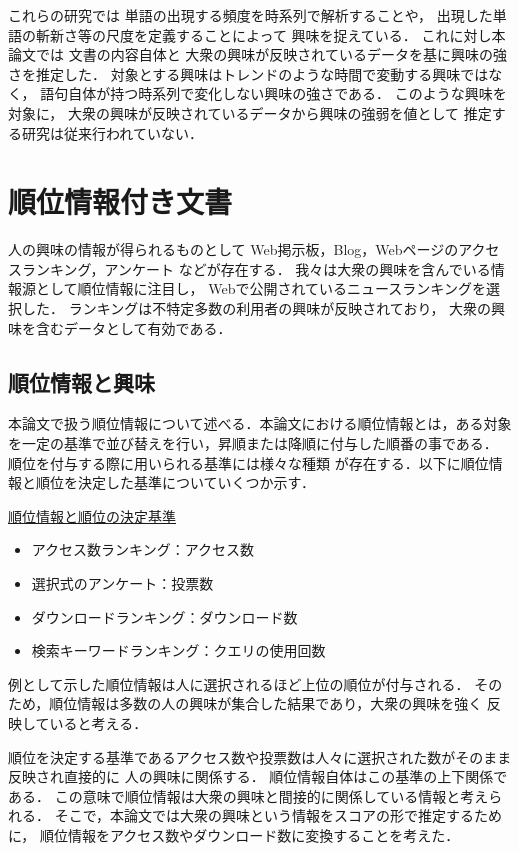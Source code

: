 \documentclass[japanese]{jnlp_1.4}
\begin{document}
これらの研究では
単語の出現する頻度を時系列で解析することや，
出現した単語の斬新さ等の尺度を定義することによって
興味を捉えている．
これに対し本論文では
文書の内容自体と
大衆の興味が反映されているデータを基に興味の強さを推定した．
対象とする興味はトレンドのような時間で変動する興味ではなく，
語句自体が持つ時系列で変化しない興味の強さである．
このような興味を対象に，
大衆の興味が反映されているデータから興味の強弱を値として
推定する研究は従来行われていない．



\section{順位情報付き文書}\label{sec_rank}


人の興味の情報が得られるものとして
Web掲示板，Blog，Webページのアクセスランキング，アンケート
などが存在する．
我々は大衆の興味を含んでいる情報源として順位情報に注目し，
Webで公開されているニュースランキングを選択した．
ランキングは不特定多数の利用者の興味が反映されており，
大衆の興味を含むデータとして有効である．



\subsection{順位情報と興味}\label{sec_RANK-INT}
本論文で扱う順位情報について述べる．本論文における順位情報とは，ある対象
を一定の基準で並び替えを行い，昇順または降順に付与した順番の事である．
順位を付与する際に用いられる基準には様々な種類
が存在する．以下に順位情報と順位を決定した基準についていくつか示す．

\underline{順位情報と順位の決定基準}

\begin{itemize}
\item アクセス数ランキング：アクセス数
\item 選択式のアンケート：投票数
\item ダウンロードランキング：ダウンロード数
\item 検索キーワードランキング：クエリの使用回数
\end{itemize}

例として示した順位情報は人に選択されるほど上位の順位が付与される．
そのため，順位情報は多数の人の興味が集合した結果であり，大衆の興味を強く
反映していると考える．

順位を決定する基準であるアクセス数や投票数は人々に選択された数がそのまま反映され直接的に
人の興味に関係する．
順位情報自体はこの基準の上下関係である．
この意味で順位情報は大衆の興味と間接的に関係している情報と考えられる．
そこで，本論文では大衆の興味という情報をスコアの形で推定するために，
順位情報をアクセス数やダウンロード数に変換することを考えた．
\end{document}
